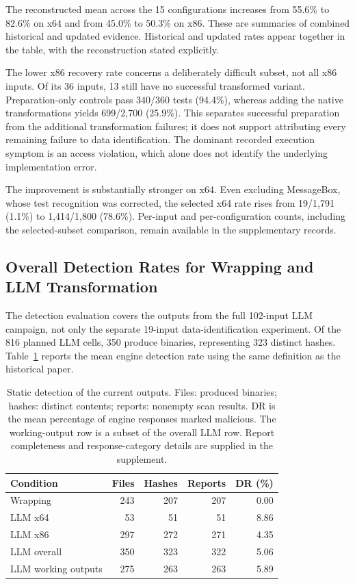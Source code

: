 The reconstructed mean across the 15 configurations increases from
55.6\% to 82.6\% on x64 and from 45.0\% to 50.3\% on x86.
These are summaries of combined historical and updated evidence. Historical and updated rates appear together in the table, with the
reconstruction stated explicitly.



The lower x86 recovery rate concerns a deliberately difficult subset,
not all x86 inputs. Of its 36 inputs, 13 still have no successful
transformed variant. Preparation-only controls pass 340/360 tests (94.4\%),
whereas adding the native transformations yields 699/2,700 (25.9\%).
This separates successful preparation from the additional transformation
failures; it does not support attributing every remaining failure to data
identification. The dominant recorded execution symptom is an access
violation, which alone does not identify the underlying implementation error.

The improvement is substantially stronger on x64. Even excluding
MessageBox, whose test recognition was corrected, the selected x64 rate
rises from 19/1,791 (1.1\%) to 1,414/1,800 (78.6\%). Per-input and
per-configuration counts, including the selected-subset comparison, remain
available in the supplementary records.

\subsection{Overall Detection Rates for Wrapping and LLM Transformation}
The detection evaluation covers the outputs from the full 102-input LLM
campaign, not only the separate 19-input data-identification experiment.
Of the 816 planned LLM cells, 350 produce binaries, representing 323
distinct hashes. Table~\ref{tab:current_scans} reports the mean engine
detection rate using the same definition as the historical paper.

\begin{table}[!htbp]
\caption{Static detection of the current outputs. Files: produced binaries;
hashes: distinct contents; reports: nonempty scan results. DR is the mean
percentage of engine responses marked malicious.
The working-output row is a subset of the overall LLM row. Report
completeness and response-category details are supplied in the supplement.}
\label{tab:current_scans}
\centering\small\setlength{\tabcolsep}{6pt}
\begin{tabular}{@{}lrrrr@{}}
\toprule
Condition & Files & Hashes & Reports & DR (\%) \\
\midrule
Wrapping & 243 & 207 & 207 & 0.00 \\
LLM x64 & 53 & 51 & 51 & 8.86 \\
LLM x86 & 297 & 272 & 271 & 4.35 \\
\midrule
LLM overall & 350 & 323 & 322 & 5.06 \\
LLM working outputs & 275 & 263 & 263 & 5.89 \\
\bottomrule
\end{tabular}
\end{table}

